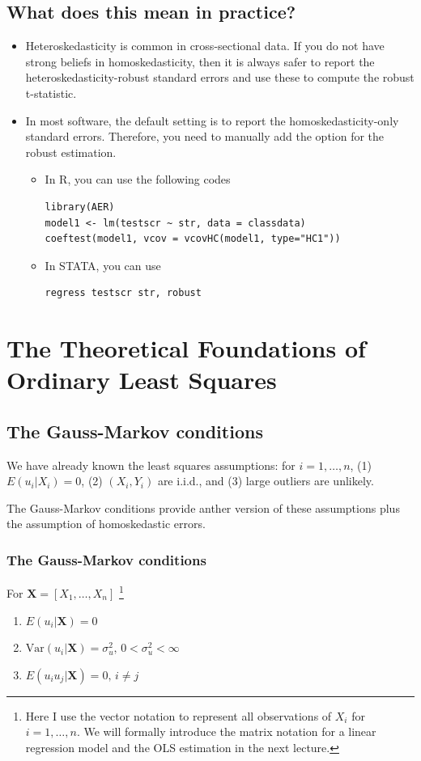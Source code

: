 \documentclass[a4paper,11pt]{article}
\newcommand{\var}{\mathrm{Var}}
\begin{document}
\subsection{What does this mean in practice?}
\label{sec:orgd7b529b}
\begin{itemize}
\item Heteroskedasticity is common in cross-sectional data. If you do not
have strong beliefs in homoskedasticity, then it is always safer to
report the heteroskedasticity-robust standard errors and use these
to compute the robust t-statistic.
\item In most software, the default setting is to report the
homoskedasticity-only standard errors. Therefore, you need to
manually add the option for the robust estimation. 

\begin{itemize}
\item In R, you can use the following codes
\begin{verbatim}
library(AER)
model1 <- lm(testscr ~ str, data = classdata)
coeftest(model1, vcov = vcovHC(model1, type="HC1"))
\end{verbatim}

\item In STATA, you can use
\begin{verbatim}
regress testscr str, robust
\end{verbatim}
\end{itemize}
\end{itemize}

\section{The Theoretical Foundations of Ordinary Least Squares}
\label{sec:orge5e6956}
\subsection{The Gauss-Markov conditions}
\label{sec:org78b6f40}
We have already known the least squares assumptions: for \(i = 1,
\ldots, n\), (1) \(E(u_i|X_i) =
0\), (2) \((X_i, Y_i)\) are i.i.d., and (3) large outliers are unlikely. 

The Gauss-Markov conditions provide anther version of these
assumptions plus the assumption of homoskedastic errors. 

\subsubsection*{The Gauss-Markov conditions}
\label{sec:orgaa5cc02}
For \(\mathbf{X} = [X_1, \ldots, X_n]\) \footnote{Here I use the vector
notation to represent all observations of \(X_i\) for \(i=1, \ldots,
n\). We will formally introduce the matrix notation for a linear
regression model and the OLS estimation in the next lecture.}
\begin{enumerate}
\item \(E(u_i| \mathbf{X}) = 0\)
\item \(\var(u_i | \mathbf{X}) = \sigma^2_u,\, 0 < \sigma^2_u < \infty\)
\item \(E(u_i u_j | \mathbf{X}) = 0,\, i \neq j\)
\end{enumerate}
\end{document}
